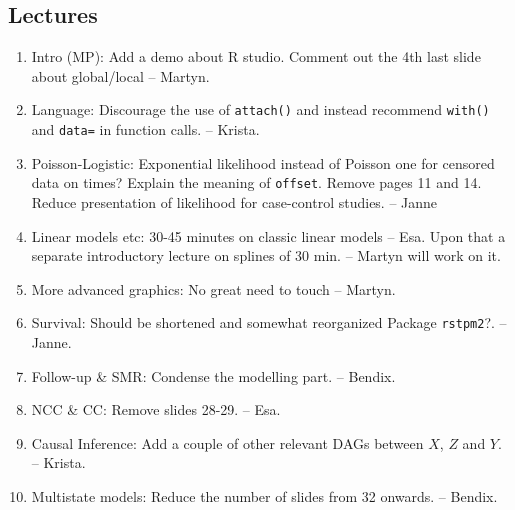 \subsection*{Lectures}
\begin{enumerate}
\item Intro (MP): Add a demo about R studio. Comment out the 4th last slide
about global/local -- Martyn.
\item Language: Discourage the use of \texttt{attach()} and instead recommend
 \texttt{with()} and \texttt{data=} in function calls. -- Krista.
\item Poisson-Logistic: Exponential likelihood instead of Poisson one for censored data on times? 
  Explain the meaning of \texttt{offset}. 
	Remove pages 11 and 14.  
		Reduce presentation of likelihood for case-control studies. -- Janne
\item Linear models etc: 30-45 minutes on classic linear models -- Esa. 
Upon that a separate introductory lecture on splines of 30 min. --  Martyn will work on it.
\item More advanced graphics: No great need to touch -- Martyn.
\item Survival: Should be shortened and somewhat reorganized Package \texttt{rstpm2}?. -- Janne.
\item Follow-up \& SMR: Condense the modelling part. -- Bendix.
\item NCC \& CC: Remove slides 28-29. -- Esa.
\item Causal Inference: Add a couple of other relevant DAGs between $X$, $Z$ and $Y$. -- Krista.
\item Multistate models: Reduce the number of slides from 32 onwards. -- Bendix.

\end{enumerate}









